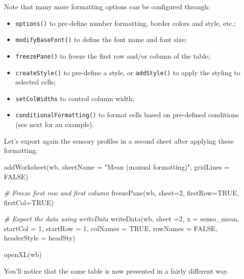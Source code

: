 \documentclass[
]{book}
\newenvironment{Shaded}{\begin{snugshade}}{\end{snugshade}}
\newcommand{\AttributeTok}[1]{\textcolor[rgb]{0.77,0.63,0.00}{#1}}
\newcommand{\CommentTok}[1]{\textcolor[rgb]{0.56,0.35,0.01}{\textit{#1}}}
\newcommand{\ConstantTok}[1]{\textcolor[rgb]{0.00,0.00,0.00}{#1}}
\newcommand{\DecValTok}[1]{\textcolor[rgb]{0.00,0.00,0.81}{#1}}
\newcommand{\FunctionTok}[1]{\textcolor[rgb]{0.00,0.00,0.00}{#1}}
\newcommand{\NormalTok}[1]{#1}
\newcommand{\StringTok}[1]{\textcolor[rgb]{0.31,0.60,0.02}{#1}}
\providecommand{\tightlist}{%
  \setlength{\itemsep}{0pt}\setlength{\parskip}{0pt}}
\begin{document}
Note that many more formatting options can be configured through:

\begin{itemize}
\tightlist
\item
  \texttt{options()} to pre-define number formatting, border colors and style, etc.;
\item
  \texttt{modifyBaseFont()} to define the font name and font size;
\item
  \texttt{freezePane()} to freeze the first row and/or column of the table;
\item
  \texttt{createStyle()} to pre-define a style, or \texttt{addStyle()} to apply the styling to selected cells;
\item
  \texttt{setColWidths} to control column width;
\item
  \texttt{conditionalFormatting()} to format cells based on pre-defined conditions (see next for an example).
\end{itemize}

Let's export again the sensory profiles in a second sheet after applying these formatting:

\begin{Shaded}
\begin{Highlighting}[]
\FunctionTok{addWorksheet}\NormalTok{(wb, }\AttributeTok{sheetName =} \StringTok{"Mean (manual formatting)"}\NormalTok{, }\AttributeTok{gridLines =} \ConstantTok{FALSE}\NormalTok{)}

\CommentTok{\# Freeze first row and first column}
\FunctionTok{freezePane}\NormalTok{(wb, }\AttributeTok{sheet=}\DecValTok{2}\NormalTok{, }\AttributeTok{firstRow=}\ConstantTok{TRUE}\NormalTok{, }\AttributeTok{firstCol=}\ConstantTok{TRUE}\NormalTok{)}

\CommentTok{\# Export the data using writeData}
\FunctionTok{writeData}\NormalTok{(wb,}
          \AttributeTok{sheet =}\DecValTok{2}\NormalTok{,}
          \AttributeTok{x =}\NormalTok{ senso\_mean, }
          \AttributeTok{startCol =} \DecValTok{1}\NormalTok{,}
          \AttributeTok{startRow =} \DecValTok{1}\NormalTok{,}
          \AttributeTok{colNames =} \ConstantTok{TRUE}\NormalTok{, }\AttributeTok{rowNames =} \ConstantTok{FALSE}\NormalTok{, }
          \AttributeTok{headerStyle =}\NormalTok{ headSty)}

\FunctionTok{openXL}\NormalTok{(wb)}
\end{Highlighting}
\end{Shaded}

You'll notice that the same table is now presented in a fairly different way.
\end{document}
